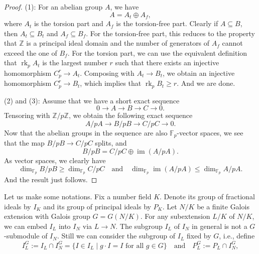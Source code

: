 \documentclass{amsart}
\numberwithin{equation}{section}
\theoremstyle{plain}
\theoremstyle{definition}
\theoremstyle{remark}
\begin{document}
\begin{proof}
	(1):
	For an abelian group $A$, we have
	\begin{equation*}
		A=A_t\oplus A_f,
	\end{equation*}
	where $A_t$ is the torsion part and $A_f$ is the torsion-free part.
	Clearly if $A\subseteq B$, then $A_t\subseteq B_t$ and $A_f\subseteq B_f$.
	For the torsion-free part, this reduces to the property that $\mathbb{Z}$ is a principal ideal domain and the number of generators of $A_f$ cannot exceed the one of $B_f$.
	For the torsion part, we can use the equivalent definition that $\operatorname{rk}_pA_t$ is the largest number $r$ such that there exists an injective homomorphism $C_p^r\to A_t$.
	Composing with $A_t\to B_t$, we obtain an injective homomorphism $C_p^r\to B_t$, which implies that $\operatorname{rk}_pB_t\geq r$.
	And we are done.
	
	(2) and (3):
	Assume that we have a short exact sequence
	\begin{equation*}
		0\to A\to B\to C\to0.
	\end{equation*}	
	Tensoring with $\mathbb{Z}/p\mathbb{Z}$, we obtain the following exact sequence
	\begin{equation*}
		A/pA\to B/pB\to C/pC\to0.
	\end{equation*}
	Now that the abelian groups in the sequence are also $\mathbb{F}_p$-vector spaces, we see that the map $B/pB\to C/pC$ splits, and
	\begin{equation*}
		B/pB=C/pC\oplus\operatorname{im}(A/pA).
	\end{equation*}
	As vector spaces, we clearly have
	\begin{equation*}
		\dim_{\mathbb{F}_p}B/pB\geq\dim_{\mathbb{F}_p}C/pC\quad\text{and}\quad\dim_{\mathbb{F}_p}\operatorname{im}(A/pA)\leq\dim_{\mathbb{F}_p}A/pA.
	\end{equation*}
	And the result just follows.
\end{proof}
Let us make some notations.
Fix a number field $K$.
Denote its group of fractional ideals by $I_K$ and its group of principal ideals by $P_K$.
Let $N/K$ be a finite Galois extension with Galois group $G=G(N/K)$.
For any subextension $L/K$ of $N/K$, we can embed $I_L$ into $I_N$ via $L\to N$.
The subgroup $I_L$ of $I_N$ in general is not a $G$-submodule of $I_N$.
Still we can consider the subgroup of $I_L$ fixed by $G$, i.e., define
\begin{equation*}
	I_L^G:=I_L\cap I_N^G=\{I\in I_L\mid g\cdot I=I\text{ for all }g\in G\}
	\quad\text{and}\quad
	P_L^G:=P_L\cap I_N^G,
\end{equation*}
\end{document}

